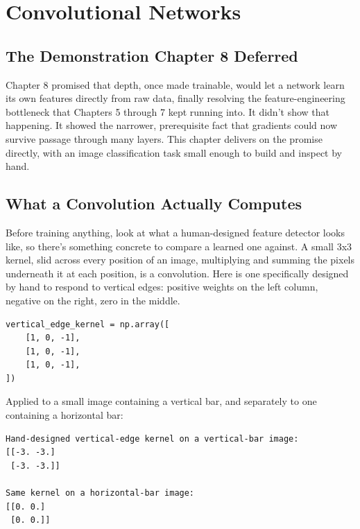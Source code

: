 \chapter{Convolutional Networks}

\section*{The Demonstration Chapter 8 Deferred}

Chapter 8 promised that depth, once made trainable, would let a network learn its own features directly from raw data, finally resolving the feature-engineering bottleneck that Chapters 5 through 7 kept running into. It didn't show that happening. It showed the narrower, prerequisite fact that gradients could now survive passage through many layers. This chapter delivers on the promise directly, with an image classification task small enough to build and inspect by hand.

\section*{What a Convolution Actually Computes}

Before training anything, look at what a human-designed feature detector looks like, so there's something concrete to compare a learned one against. A small 3x3 kernel, slid across every position of an image, multiplying and summing the pixels underneath it at each position, is a convolution. Here is one specifically designed by hand to respond to vertical edges: positive weights on the left column, negative on the right, zero in the middle.

\begin{Verbatim}[fontsize=\small, frame=single, xleftmargin=1em, xrightmargin=1em]
vertical_edge_kernel = np.array([
    [1, 0, -1],
    [1, 0, -1],
    [1, 0, -1],
])
\end{Verbatim}

Applied to a small image containing a vertical bar, and separately to one containing a horizontal bar:

\begin{Verbatim}[fontsize=\small, frame=single, xleftmargin=1em, xrightmargin=1em]
Hand-designed vertical-edge kernel on a vertical-bar image:
[[-3. -3.]
 [-3. -3.]]

Same kernel on a horizontal-bar image:
[[0. 0.]
 [0. 0.]]
\end{Verbatim}

